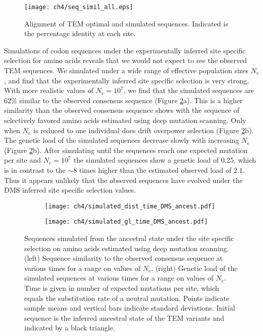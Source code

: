 \begin{figure}[H]
     \centering
	\texttt{[image: ch4/seq\_simil\_all.eps]}
	\caption{Alignment of TEM optimal and simulated sequences. Indicated is the percentage identity at each site.}
	\label{fig:sim_seqs_cons}
\end{figure}

Simulations of codon sequences under the experimentally inferred site specific selection for amino acids reveals that we would not expect to see the observed TEM sequences.
We simulated under a wide range of effective population sizes $N_e$, and find that the experimentally inferred site specific selection is very strong.
With more realistic values of $N_e = 10^7$, we find that the simulated sequences are $62 \%$ similar to the observed consensus sequence (Figure \ref{fig:dms_sim}a).
This is a higher similarity than the observed consensus sequence shows with the sequence of selectively favored amino acids estimated using deep mutation scanning.
Only when $N_e$ is reduced to one individual does drift overpower selection (Figure \ref{fig:dms_sim}b).
The genetic load of the simulated sequences decrease slowly with increasing $N_e$ (Figure \ref{fig:dms_sim}b).
After simulating until the sequences reach one expected mutation per site and $N_e = 10^7$ the simulated sequences show a genetic load of 0.25, which is in contrast to the $\sim 8$ times higher than the estimated observed load of $2.1$.
Thus it appears unlikely that the observed sequences have evolved under the DMS inferred site specific selection values.


\begin{figure}[h]
    \centering
    \begin{subfigure}
        \centering
        \texttt{[image: ch4/simulated\_dist\_time\_DMS\_ancest.pdf]}
    \end{subfigure}
    \begin{subfigure}
        \centering
        \texttt{[image: ch4/simulated\_gl\_time\_DMS\_ancest.pdf]}
    \end{subfigure}
    \caption{Sequences simulated from the ancestral state under the site specific selection on amino acids estimated using deep mutation scanning. 
    (left) Sequence similarity to the observed consensus sequence at various times for a range on values of $N_e$.
    (right) Genetic load of the simulated sequences at various times for a range on values of $N_e$.
    Time is given in number of expected mutations per site, which equals the substitution rate of a neutral mutation.
    Points indicate sample means and vertical bars indicate standard deviations. Initial sequence is the inferred ancestral state of the TEM variants and indicated by a black triangle.}
    \label{fig:dms_sim}
\end{figure}

